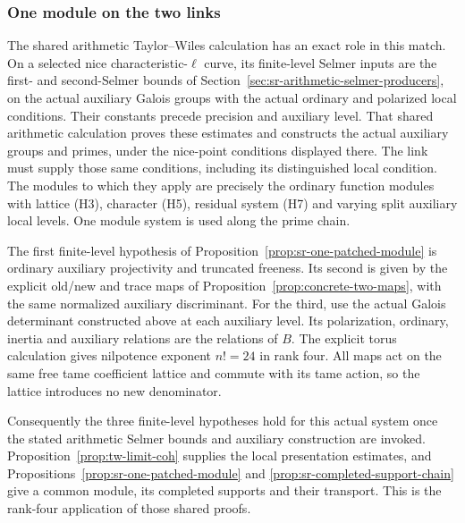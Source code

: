 \subsubsection{One module on the two links}
The shared arithmetic Taylor--Wiles calculation has an
exact role in this match.
On a selected nice characteristic-\(\ell\) curve, its
finite-level Selmer inputs are the first- and second-Selmer bounds
of Section~\ref{sec:sr-arithmetic-selmer-producers}, on the actual auxiliary
Galois groups with the actual ordinary and polarized
local conditions. Their constants precede precision
and auxiliary level.
That shared arithmetic calculation proves these estimates and
constructs the actual auxiliary groups and primes, under the nice-point
conditions displayed there. The link must supply those same conditions,
including its distinguished local  condition.
The modules to which they apply are precisely the
ordinary function modules with lattice (H3),
character (H5), residual system (H7) and varying
split auxiliary local levels.
One module system is used along the prime chain.

The first finite-level hypothesis of
Proposition~\ref{prop:sr-one-patched-module}
is ordinary auxiliary projectivity and truncated
freeness.
Its second is given by the explicit old/new and
trace maps of
Proposition~\ref{prop:concrete-two-maps},
with the same normalized auxiliary discriminant.
For the third, use the actual Galois determinant
constructed above at each auxiliary level.
Its polarization, ordinary, inertia and auxiliary
relations are the relations of \(B\).
The explicit torus calculation gives nilpotence
exponent \(n!=24\) in rank four.
All maps act on the same free tame coefficient
lattice and commute with its tame action, so the
lattice introduces no new denominator.

Consequently the three finite-level hypotheses hold
for this actual system once the stated arithmetic
Selmer bounds and auxiliary construction are invoked.
Proposition~\ref{prop:tw-limit-coh} supplies the local
presentation estimates, and
Propositions~\ref{prop:sr-one-patched-module} and
\ref{prop:sr-completed-support-chain} give a common
module, its completed supports and their transport.
This is the rank-four application of those shared proofs.

